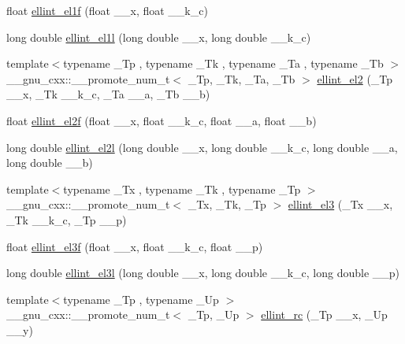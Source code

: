 \begin{DoxyCompactItemize}
\item 
float \hyperlink{namespace____gnu__cxx_a8d8342bb4f42c7fe09b5589c54d4e713}{ellint\+\_\+el1f} (float \+\_\+\+\_\+x, float \+\_\+\+\_\+k\+\_\+c)
\item 
long double \hyperlink{namespace____gnu__cxx_aeed1201e421be410460739048cba5cd8}{ellint\+\_\+el1l} (long double \+\_\+\+\_\+x, long double \+\_\+\+\_\+k\+\_\+c)
\item 
{\footnotesize template$<$typename \+\_\+\+Tp , typename \+\_\+\+Tk , typename \+\_\+\+Ta , typename \+\_\+\+Tb $>$ }\\\+\_\+\+\_\+gnu\+\_\+cxx\+::\+\_\+\+\_\+promote\+\_\+num\+\_\+t$<$ \+\_\+\+Tp, \+\_\+\+Tk, \+\_\+\+Ta, \+\_\+\+Tb $>$ \hyperlink{namespace____gnu__cxx_a1a6bd1d29fe62172ddb40e200a2d0d1f}{ellint\+\_\+el2} (\+\_\+\+Tp \+\_\+\+\_\+x, \+\_\+\+Tk \+\_\+\+\_\+k\+\_\+c, \+\_\+\+Ta \+\_\+\+\_\+a, \+\_\+\+Tb \+\_\+\+\_\+b)
\item 
float \hyperlink{namespace____gnu__cxx_a0bf7469fe7ac92e9a2ffa0f92ea62248}{ellint\+\_\+el2f} (float \+\_\+\+\_\+x, float \+\_\+\+\_\+k\+\_\+c, float \+\_\+\+\_\+a, float \+\_\+\+\_\+b)
\item 
long double \hyperlink{namespace____gnu__cxx_a491439a09e6000659444f52dc3c9f215}{ellint\+\_\+el2l} (long double \+\_\+\+\_\+x, long double \+\_\+\+\_\+k\+\_\+c, long double \+\_\+\+\_\+a, long double \+\_\+\+\_\+b)
\item 
{\footnotesize template$<$typename \+\_\+\+Tx , typename \+\_\+\+Tk , typename \+\_\+\+Tp $>$ }\\\+\_\+\+\_\+gnu\+\_\+cxx\+::\+\_\+\+\_\+promote\+\_\+num\+\_\+t$<$ \+\_\+\+Tx, \+\_\+\+Tk, \+\_\+\+Tp $>$ \hyperlink{namespace____gnu__cxx_a62f3a824cc224012ed4328a2d3709dcc}{ellint\+\_\+el3} (\+\_\+\+Tx \+\_\+\+\_\+x, \+\_\+\+Tk \+\_\+\+\_\+k\+\_\+c, \+\_\+\+Tp \+\_\+\+\_\+p)
\item 
float \hyperlink{namespace____gnu__cxx_a66131a8ecc14b5228a73a01121f60a35}{ellint\+\_\+el3f} (float \+\_\+\+\_\+x, float \+\_\+\+\_\+k\+\_\+c, float \+\_\+\+\_\+p)
\item 
long double \hyperlink{namespace____gnu__cxx_a0d90e66f799a2ebe4bec43eef0d53355}{ellint\+\_\+el3l} (long double \+\_\+\+\_\+x, long double \+\_\+\+\_\+k\+\_\+c, long double \+\_\+\+\_\+p)
\item 
{\footnotesize template$<$typename \+\_\+\+Tp , typename \+\_\+\+Up $>$ }\\\+\_\+\+\_\+gnu\+\_\+cxx\+::\+\_\+\+\_\+promote\+\_\+num\+\_\+t$<$ \+\_\+\+Tp, \+\_\+\+Up $>$ \hyperlink{namespace____gnu__cxx_a183d78859b56f93237567e6322164832}{ellint\+\_\+rc} (\+\_\+\+Tp \+\_\+\+\_\+x, \+\_\+\+Up \+\_\+\+\_\+y)

\end{DoxyCompactItemize}
